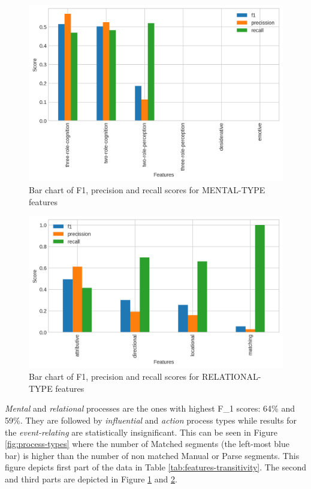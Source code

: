 \begin{figure}[!ht]
    \centering
    \includegraphics[width=.65\textwidth]{evaluation-results/figures/accuracy-semantic-mental-type-f1}
    \caption{Bar chart of F1, precision and recall scores for MENTAL-TYPE features}
    \label{fig:mental-types}
\end{figure}

\begin{figure}[!ht]
    \centering
    \includegraphics[width=.65\textwidth]{evaluation-results/figures/accuracy-semantic-relational-type-f1}
    \caption{Bar chart of F1, precision and recall scores for RELATIONAL-TYPE features}
    \label{fig:relational-types}
\end{figure}

\textit{Mental} and \textit{relational} processes are the ones with highest F_1 scores: 64\% and 59\%. They are followed by \textit{influential} and \textit{action} process types while results for the \textit{event-relating} are statistically insignificant. This can be seen in Figure \ref{fig:process-types} where the number of Matched segments (the left-most blue bar) is higher than the number of non matched Manual or Parse segments. This figure depicts first part of the data in Table \ref{tab:features-transitivity}. The second and third parts are depicted in Figure \ref{fig:mental-types} and \ref{fig:relational-types}.

